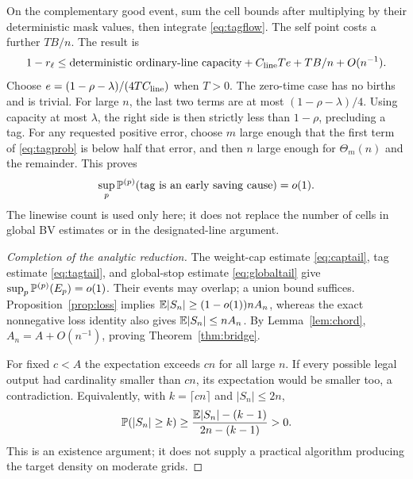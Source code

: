 On the complementary good event, sum the cell bounds after multiplying
by their deterministic mask values, then integrate \eqref{eq:tagflow}.
The self point costs a further \(TB/n\). The result is
\begin{equation}\label{eq:tagcapacity}
 1-r_\ell\le\text{deterministic ordinary-line capacity}
       +C_{\rm line}Te+TB/n+O(n^{-1}).
\end{equation}
Choose \(e=(1-\rho-\lambda)/(4TC_{\rm line})\) when \(T>0\).
The zero-time case has no births and is trivial. For large \(n\),
the last two terms are at most \((1-\rho-\lambda)/4\).
Using capacity at most \(\lambda\), the right side is then strictly
less than \(1-\rho\), precluding a tag. For any requested positive
error, choose \(m\) large enough that the first term of
\eqref{eq:tagprob} is below half that error, and then \(n\) large
enough for \(\Theta_m(n)\) and the remainder. This proves
\begin{equation}\label{eq:tagtail}
 \sup_p\mathbb P^{(p)}(\text{tag is an early saving cause})=o(1).
\end{equation}
The linewise count is used only here; it does not replace the number
of cells in global BV estimates or in the designated-line argument.

\begin{proof}[Completion of the analytic reduction]
The weight-cap estimate \eqref{eq:captail}, tag estimate
\eqref{eq:tagtail}, and global-stop estimate \eqref{eq:globaltail}
give \(\sup_p\mathbb P^{(p)}(E_p)=o(1)\). Their events may overlap;
a union bound suffices. Proposition~\ref{prop:loss} implies
\(\mathbb E|S_n|\ge(1-o(1))nA_n\), whereas the exact nonnegative loss
identity also gives \(\mathbb E|S_n|\le nA_n\). By Lemma~\ref{lem:chord},
\(A_n=A+O(n^{-1})\), proving Theorem~\ref{thm:bridge}.

For fixed \(c<A\) the expectation exceeds \(cn\) for all large
\(n\). If every possible legal output had cardinality smaller than
\(cn\), its expectation would be smaller too, a contradiction.
Equivalently, with \(k=\lceil cn\rceil\) and \(|S_n|\le2n\),
\[
 \mathbb P(|S_n|\ge k)\ge
 \frac{\mathbb E|S_n|-(k-1)}{2n-(k-1)}>0.
\]
This is an existence argument; it does not supply a practical
algorithm producing the target density on moderate grids.
\end{proof}

